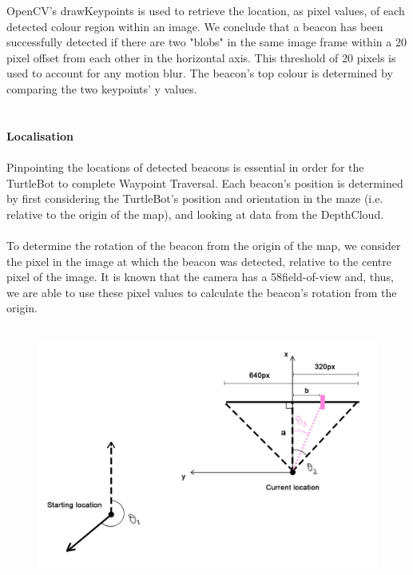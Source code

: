 \documentclass[titlepage,12pt,a4paper]{article}
\begin{document}
\noindent
OpenCV's drawKeypoints is used to retrieve the location, as pixel values, of each detected colour region within an image. We conclude that a beacon has been successfully detected if there are two "blobs" in the same image frame within a 20 pixel offset from each other in the horizontal axis. This threshold of 20 pixels is used to account for any motion blur. The beacon's top colour is determined by comparing the two keypoints' y values.\\
\\
\large{\textbf{\\Localisation}} \\
\normalsize
\\
Pinpointing the locations of detected beacons is essential in order for the TurtleBot to complete Waypoint Traversal. Each beacon's position is determined by first considering the TurtleBot's position and orientation in the maze (i.e. relative to the origin of the map), and looking at data from the DepthCloud. \\
\\
To determine the rotation of the beacon from the origin of the map, we consider the pixel in the image at which the beacon was detected, relative to the centre pixel of the image. It is known that the camera has a 58\degree field-of-view and, thus, we are able to use these pixel values to calculate the beacon's rotation from the origin. \\
\\
\begin{figure}[h]
	\includegraphics[scale=0.3]{beacon.jpg}
\end{figure}
\end{document}
